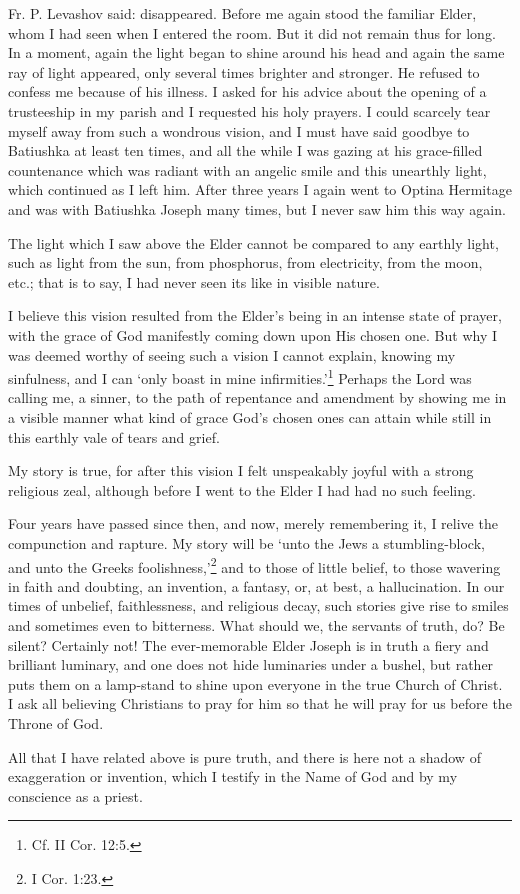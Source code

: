 \begin{longquote}{Fr. P. Levashov said:}
disappeared. Before me again stood the familiar Elder, whom I had seen when I entered the room. But it did not remain thus for long. In a moment, again the light began to shine around his head and again the same ray of light appeared, only several times brighter and stronger. He refused to confess me because of his illness. I asked for his advice about the opening of a trusteeship in my parish and I requested his holy prayers. I could scarcely tear myself away from such a wondrous vision, and I must have said goodbye to Batiushka at least ten times, and all the while I was gazing at his grace-filled countenance which was radiant with an angelic smile and this unearthly light, which continued as I left him. After three years I again went to Optina Hermitage and was with Batiushka Joseph many times, but I never saw him this way again.

The light which I saw above the Elder cannot be compared to any earthly light, such as light from the sun, from phosphorus, from electricity, from the moon, etc.; that is to say, I had never seen its like in visible nature.

I believe this vision resulted from the Elder's being in an intense state of prayer, with the grace of God manifestly coming down upon His chosen one. But why I was deemed worthy of seeing such a vision I cannot explain, knowing my sinfulness, and I can `only boast in mine infirmities.'\footnote{Cf. II Cor. 12:5.} Perhaps the Lord was calling me, a sinner, to the path of repentance and amendment by showing me in a visible manner what kind of grace God's chosen ones can attain while still in this earthly vale of tears and grief.

My story is true, for after this vision I felt unspeakably joyful with a strong religious zeal, although before I went to the Elder I had had no such feeling.

Four years have passed since then, and now, merely remembering it, I relive the compunction and rapture. My story will be `unto the Jews a stumbling-block, and unto the Greeks foolishness,'\footnote{I Cor. 1:23.} and to those of little belief, to those wavering in faith and doubting, an invention, a fantasy, or, at best, a hallucination. In our times of unbelief, faithlessness, and religious decay, such stories give rise to smiles and sometimes even to bitterness. What should we, the servants of truth, do? Be silent? Certainly not! The ever-memorable Elder Joseph is in truth a fiery and brilliant luminary, and one does not hide luminaries under a bushel, but rather puts them on a lamp-stand to shine upon everyone in the true Church of Christ. I ask all believing Christians to pray for him so that he will pray for us before the Throne of God.

All that I have related above is pure truth, and there is here not a shadow of exaggeration or invention, which I testify in the Name of God and by my conscience as a priest.
\end{longquote}
